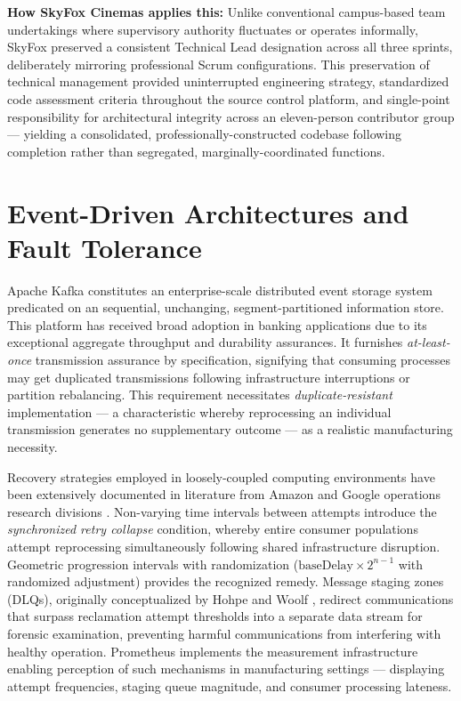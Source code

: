 \textbf{How SkyFox Cinemas applies this:} Unlike conventional campus-based team undertakings 
where supervisory authority fluctuates or operates informally, SkyFox preserved a consistent 
Technical Lead designation across all three sprints, deliberately mirroring professional 
Scrum configurations. This preservation of technical management provided uninterrupted 
engineering strategy, standardized code assessment criteria throughout the source control 
platform, and single-point responsibility for architectural integrity across an eleven-person 
contributor group --- yielding a consolidated, professionally-constructed codebase following 
completion rather than segregated, marginally-coordinated functions.

\section{Event-Driven Architectures and Fault Tolerance}

Apache Kafka \cite{Kreps2011} constitutes an enterprise-scale distributed event storage 
system predicated on an sequential, unchanging, segment-partitioned information store. This 
platform has received broad adoption in banking applications due to its exceptional aggregate 
throughput and durability assurances. It furnishes \textit{at-least-once} transmission assurance 
by specification, signifying that consuming processes may get duplicated transmissions following 
infrastructure interruptions or partition rebalancing. This requirement necessitates 
\textit{duplicate-resistant} implementation --- a characteristic whereby reprocessing an 
individual transmission generates no supplementary outcome --- as a realistic manufacturing 
necessity.

Recovery strategies employed in loosely-coupled computing environments have been extensively 
documented in literature from Amazon and Google operations research divisions \cite{Google2016}. 
Non-varying time intervals between attempts introduce the \textit{synchronized retry collapse} 
condition, whereby entire consumer populations attempt reprocessing simultaneously following 
shared infrastructure disruption. Geometric progression intervals with randomization 
($\text{baseDelay} \times 2^{n-1}$ with randomized adjustment) provides the recognized remedy. 
Message staging zones (DLQs), originally conceptualized by Hohpe and Woolf \cite{Hohpe2003}, 
redirect communications that surpass reclamation attempt thresholds into a separate data stream 
for forensic examination, preventing harmful communications from interfering with healthy 
operation. Prometheus \cite{Prometheus2024} implements the measurement infrastructure enabling 
perception of such mechanisms in manufacturing settings --- displaying attempt frequencies, 
staging queue magnitude, and consumer processing lateness.

